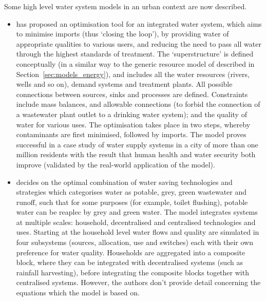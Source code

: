 Some high level water system models in an urban context are now described. 
\begin{itemize}
	\item \citet{Lim2010} has proposed an optimisation tool for an integrated water system, which aims to minimise imports (thus `closing the loop'), by providing water of appropriate qualities to various users, and reducing the need to pass all water through the highest standards of treatment. The `superstructure' is defined conceptually (in a similar way to the generic resource model of \citet{Samsatli} described in Section~\ref{sec:models_energy}), and includes all the water resources (rivers, wells and so on), demand systems and treatment plants. All possible connections between sources, sinks and processes are defined. Constraints include mass balances, and allowable connections (to forbid the connection of a wastewater plant outlet to a drinking water system); and the quality of water for various uses. The optimisation takes place in two steps, whereby contaminants are first minimised, followed by imports. The model proves successful in a case study of water supply systems in a city of more than one million residents with the result that human health and water security both improve (validated by the real-world application of the model).
	\item \citet{Makropoulos2008} decides on the optimal combination of water saving technologies and strategies which categorises water as potable, grey, green wastewater and runoff, such that for some purposes (for example, toilet flushing), potable water can be reaplec by grey and green water. The model integrates systems at multiple scales: household, decentralised and centralised technologies and uses. Starting at the household level water flows and quality are simulated in four subsystems (sources, allocation, use and switches) each with their own preference for water quality. Households are aggregated into a composite block, where they can be integrated with decentralised systems (such as rainfall harvesting), before integrating the composite blocks together with centralised systems. However, the authors don't provide detail concerning the equations which the model is based on.
\end{itemize}

